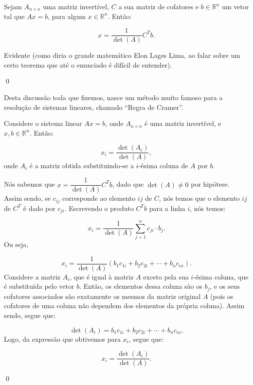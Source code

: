 \begin{Corolary}
	Sejam $A_{n\times n}$ uma matriz invertível, $C$ a sua matriz de cofatores e $b\in\mathbb{R}^{n}$ um vetor tal que $Ax = b$, para algum $x\in\mathbb{R}^n$. Então:
	
	$$
	x = \dfrac{1}{\det(A)}C^Tb.
	$$
\end{Corolary}

\begin{Proof}
	Evidente (como diria o grande matemático Elon Lages Lima, ao falar sobre um certo teorema que até o enunciado é difícil de entender).
	
	\qed
\end{Proof}

Desta discussão toda que fizemos, nasce um método muito famoso para a resolução de sistemas lineares, chamado ``Regra de Cramer''.

\begin{Theorem}
	Considere o sistema linear $Ax = b$, onde $A_{n\times n}$ é uma matriz invertível, e $x, b\in\mathbb{R}^n$. Então:
	
	$$
	x_i = \dfrac{\det(A_i)}{\det(A)},
	$$
	onde $A_i$ é a matriz obtida substituindo-se a $i$-ésima coluna de $A$ por $b$.
\end{Theorem}

\begin{Proof}
	Nós sabemos que $x = \dfrac{1}{\det(A)}C^Tb$, dado que $\det(A)\neq 0$ por hipótese. Assim sendo, se $c_{ij}$ corresponde ao elemento $ij$ de $C$, nós temos que o elemento $ij$ de $C^T$ é dado por $c_{ji}$. Escrevendo o produto $C^Tb$ para a linha $i$, nós temos:
	
	$$
	x_i = \dfrac{1}{\det(A)}\sum\limits_{j = 1}^{n} c_{ji}\cdot b_j.
 	$$
 	Ou seja, 
 	
 	$$
 	x_i = \dfrac{1}{\det(A)}(b_1c_{1i} + b_2c_{2i} + \cdots + b_nc_{ni}).
 	$$
 	Considere a matriz $A_i$, que é igual à matriz $A$ exceto pela sua $i$-ésima coluna, que é substituída pelo vetor $b$. Então, os elementos dessa coluna são os $b_j$, e os seus cofatores associados são exatamente os mesmos da matriz original $A$ (pois os cofatores de uma coluna não dependem dos elementos da própria coluna). Assim sendo, segue que:
 	
 	$$
 	\det(A_i) = b_1c_{1i} + b_2c_{2i} + \cdots + b_nc_{ni}.
 	$$
 	Logo, da expressão que obtivemos para $x_i$, segue que:
 	
 	$$
 	x_i = \dfrac{\det(A_i)}{\det(A)}.
 	$$
 	
 	\qed
\end{Proof}

